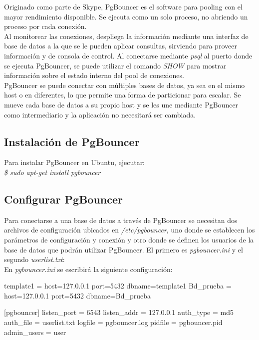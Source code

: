 Originado como parte de Skype, PgBouncer es el software para pooling con el mayor rendimiento disponible. Se ejecuta como un solo proceso, no abriendo un proceso por cada conexión.\\

Al monitorear las conexiones, despliega la información mediante una interfaz de base de datos a la que se le pueden aplicar consultas, sirviendo para proveer información y de consola de control. Al conectarse mediante \textit{psql} al puerto donde se ejecuta PgBouncer, se puede utilizar el comando \textit{SHOW} para mostrar información sobre el estado interno del pool de conexiones.\\

PgBouncer se puede conectar con múltiples bases de datos, ya sea en el mismo host o en diferentes, lo que permite una forma de particionar para escalar. Se mueve cada base de datos a su propio host y se les une mediante PgBouncer como intermediario y la aplicación no necesitará ser cambiada.

\subsection{Instalación de PgBouncer}

Para instalar PgBouncer en Ubuntu, ejecutar:\\

\emph{\$ sudo apt-get install pgbouncer}\\

\subsection{Configurar PgBouncer}

Para conectarse a una base de datos a través de PgBouncer se necesitan dos archivos de configuración ubicados en \textit{/etc/pgbouncer}, uno donde se establecen los parámetros de configuración y conexión y otro donde se definen los usuarios de la base de datos que podrán utilizar PgBouncer. El primero es \textit{pgbouncer.ini} y el segundo \textit{userlist.txt}:\\

En \textit{pgbouncer.ini} se escribirá la siguiente configuración:\\

\begin{pyglist}
[databases]
template1 = host=127.0.0.1 port=5432 dbname=template1
Bd_prueba = host=127.0.0.1 port=5432 dbname=Bd_prueba

[pgbouncer]
listen_port = 6543
listen_addr = 127.0.0.1
auth_type = md5
auth_file = userlist.txt
logfile = pgbouncer.log
pidfile = pgbouncer.pid
admin_users = user
\end{pyglist}

